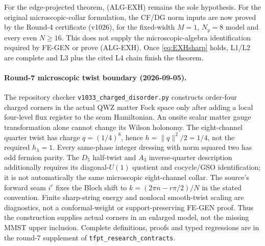 \begin{center}
{\begin{minipage}{0.92\textwidth}
\smallskip
For the edge-projected theorem, \textup{(ALG-EXH)} remains the sole hypothesis.
For the original microscopic-collar formulation, the CF/DG norm inputs are
now proved by the Round-4 certificate (v1026), for the fixed-width
$M=1$, $N_y=8$ model and every even $N\ge16$.
This does not supply the microscopic-algebra identification required by
FE-GEN or prove \textup{(ALG-EXH)}.
Once \eqref{eq:EXHsharp} holds, L1/L2 are complete and L3 plus the cited
L4 chain finish the theorem.
\end{minipage}}
\end{center}

\paragraph{Round-7 microscopic twist boundary (2026-09-05).}
The repository checker \texttt{v1033\_charged\_disorder.py} constructs
order-four charged corners in the actual QWZ matter Fock space only after
adding a local four-level flux register to the seam Hamiltonian.
An onsite scalar matter gauge transformation alone cannot change its
Wilson holonomy. The eight-channel quarter twist has charge
$q=(1/4)^8$, hence $h=\lVert q\rVert^2/2=1/4$, not the required
$h_\lambda=1$. Every same-phase integer dressing with norm squared two
has odd fermion parity. The $D_5$ half-twist and $A_3$ inverse-quarter
description additionally requires its diagonal-$U(1)$ quotient and
cocycle/GSO identification; it is not automatically the same microscopic
eight-channel collar. The source's forward seam $i^r$ fixes the Bloch
shift to $k=(2\pi n-r\pi/2)/N$ in the stated convention.
Finite sharp-string energy and nonlocal smooth-twist scaling are
diagnostics, not a conformal-weight or support-preserving FE-GEN proof.
Thus the construction supplies actual corners in an enlarged model,
not the missing MMST upper inclusion. Complete definitions, proofs and
typed regressions are in the round-7 supplement of
\texttt{tfpt\_research\_contracts}.

